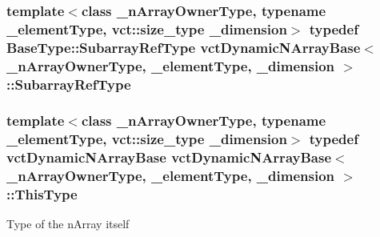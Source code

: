 \hypertarget{classvct_dynamic_n_array_base_a473d1fefa0debae5d9f6b0cd3a05f269}{
\subsubsection[{Subarray\-Ref\-Type}]{\setlength{\rightskip}{0pt plus 5cm}template$<$class \-\_\-n\-Array\-Owner\-Type, typename \-\_\-element\-Type, vct\-::size\-\_\-type \-\_\-dimension$>$ typedef {\bf Base\-Type\-::\-Subarray\-Ref\-Type} {\bf vct\-Dynamic\-N\-Array\-Base}$<$ \-\_\-n\-Array\-Owner\-Type, \-\_\-element\-Type, \-\_\-dimension $>$\-::{\bf Subarray\-Ref\-Type}}}\label{classvct_dynamic_n_array_base_a473d1fefa0debae5d9f6b0cd3a05f269}
\hypertarget{classvct_dynamic_n_array_base_a22ffd87e54134c364487952ce7d84dd5}{
\subsubsection[{This\-Type}]{\setlength{\rightskip}{0pt plus 5cm}template$<$class \-\_\-n\-Array\-Owner\-Type, typename \-\_\-element\-Type, vct\-::size\-\_\-type \-\_\-dimension$>$ typedef {\bf vct\-Dynamic\-N\-Array\-Base} {\bf vct\-Dynamic\-N\-Array\-Base}$<$ \-\_\-n\-Array\-Owner\-Type, \-\_\-element\-Type, \-\_\-dimension $>$\-::{\bf This\-Type}}}\label{classvct_dynamic_n_array_base_a22ffd87e54134c364487952ce7d84dd5}
Type of the n\-Array itself 

